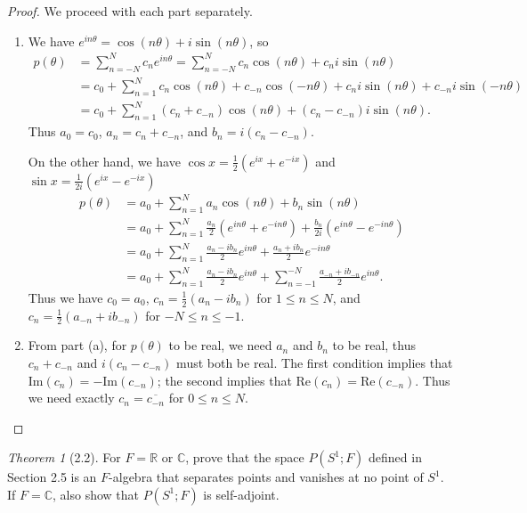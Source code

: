 \documentclass[12pt]{article}
\theoremstyle{remark}
\theoremstyle{named}
\newtheorem*{theorem}{Theorem}
\renewcommand{\t}{\theta}
\newcommand{\R}{\mathbb R}
\newcommand{\C}{\mathbb C}
\renewcommand{\Im}{\text{Im}}
\begin{document}
\begin{proof}
    We proceed with each part separately.
    \begin{enumerate}
        \item We have \(e^{in \t} = \cos (n\t) + i \sin (n\t)\), so 
        \begin{align*}
            p(\t) &= \sum_{n = -N}^{N} c_n e^{i n \t} = \sum_{n = -N}^{N} c_n \cos(n\t) + c_n i \sin(n\t) \\
            &= c_0 + \sum_{n = 1}^{N} c_n \cos(n\t) + c_{-n} \cos(-n\t) + c_n i \sin(n\t) + c_{-n} i \sin(-n\t) \\
            &= c_0 + \sum_{n = 1}^{N} (c_n + c_{-n}) \cos(n\t) + (c_n - c_{-n}) i \sin(n\t).
        \end{align*}
        Thus \(a_0 = c_0\), \(a_n = c_n + c_{-n}\), and \(b_n = i(c_n - c_{-n})\).

        On the other hand, we have \(\cos x = \frac{1}{2}(e^{ix} + e^{-ix})\) and \(\sin x = \frac{1}{2i}(e^{ix} - e^{-ix})\)
        \begin{align*}
            p(\t) &= a_0 + \sum_{n = 1}^{N} a_n \cos(n\t) + b_n \sin(n\t) \\
            &= a_0 + \sum_{n = 1}^{N} \frac{a_n}{2} (e^{in\t} + e^{-in\t}) + \frac{b_n}{2i} (e^{in\t} - e^{-in\t}) \\
            &= a_0 + \sum_{n = 1}^{N} \frac{a_n - i b_n}{2} e^{in\t} + \frac{a_n + i b_n}{2} e^{-in\t} \\
            &= a_0 + \sum_{n = 1}^{N} \frac{a_n - i b_n}{2} e^{in\t} + \sum_{n = -1}^{-N} \frac{a_{-n} + i b_{-n}}{2} e^{in\t}.
        \end{align*}
        Thus we have \(c_0 = a_0\), \(c_n = \frac{1}{2} (a_n - i b_n)\) for \(1 \leq n \leq N\), and \(c_n = \frac{1}{2} (a_{-n} + i b_{-n})\) for \(-N \leq n \leq -1\).

        \item From part (a), for \(p(\t)\) to be real, we need \(a_n\) and \(b_n\) to be real, thus \(c_n + c_{-n}\) and \(i(c_n - c_{-n})\) must both be real. The first condition implies that \(\Im(c_n) = -\Im(c_{-n})\); the second implies that \(\text{Re}(c_n) = \text{Re}(c_{-n})\). Thus we need exactly \(c_n = \overline{c_{-n}}\) for \(0 \leq n \leq N\).
    \end{enumerate}
\end{proof}

\begin{theorem}[2.2]
    For \(F = \R\) or \(\C\), prove that the space \(P(S^1; F)\) defined in Section 2.5 is an \(F\)-algebra that separates points and vanishes at no point of \(S^1\). If \(F = \C\), also show that \(P(S^1; F)\) is self-adjoint.
\end{theorem}
\end{document}
